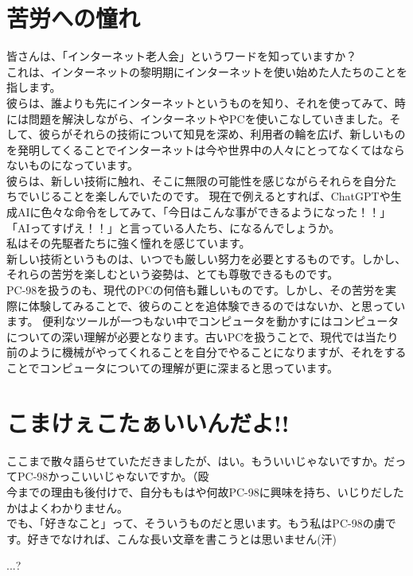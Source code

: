 \documentclass[b5paper,9pt,platex,dvipdfmx]{jsarticle}
\begin{document}
\begin{multicols*}{3}
\section[short]{苦労への憧れ}
皆さんは、「インターネット老人会」というワードを知っていますか？\\
これは、インターネットの黎明期にインターネットを使い始めた人たちのことを指します。\\
彼らは、誰よりも先にインターネットというものを知り、それを使ってみて、時には問題を解決しながら、インターネットやPCを使いこなしていきました。そして、彼らがそれらの技術について知見を深め、利用者の輪を広げ、新しいものを発明してくることでインターネットは今や世界中の人々にとってなくてはならないものになっています。\\
彼らは、新しい技術に触れ、そこに無限の可能性を感じながらそれらを自分たちでいじることを楽しんでいたのです。
現在で例えるとすれば、ChatGPTや生成AIに色々な命令をしてみて、「今日はこんな事ができるようになった！！」「AIってすげえ！！」と言っている人たち、になるんでしょうか。\\
私はその先駆者たちに強く憧れを感じています。\\
新しい技術というものは、いつでも厳しい努力を必要とするものです。しかし、それらの苦労を楽しむという姿勢は、とても尊敬できるものです。\\
PC-98を扱うのも、現代のPCの何倍も難しいものです。しかし、その苦労を実際に体験してみることで、彼らのことを追体験できるのではないか、と思っています。
便利なツールが一つもない中でコンピュータを動かすにはコンピュータについての深い理解が必要となります。古いPCを扱うことで、現代では当たり前のように機械がやってくれることを自分でやることになりますが、それをすることでコンピュータについての理解が更に深まると思っています。\\
\section[short]{こまけぇこたぁいいんだよ!!}
ここまで散々語らせていただきましたが、はい。もういいじゃないですか。だってPC-98かっこいいじゃないですか。（殴\\
今までの理由も後付けで、自分ももはや何故PC-98に興味を持ち、いじりだしたかはよくわかりません。\\
でも、「好きなこと」って、そういうものだと思います。もう私はPC-98の虜です。好きでなければ、こんな長い文章を書こうとは思いません(汗)
\end{multicols*}
...?
\end{document}
